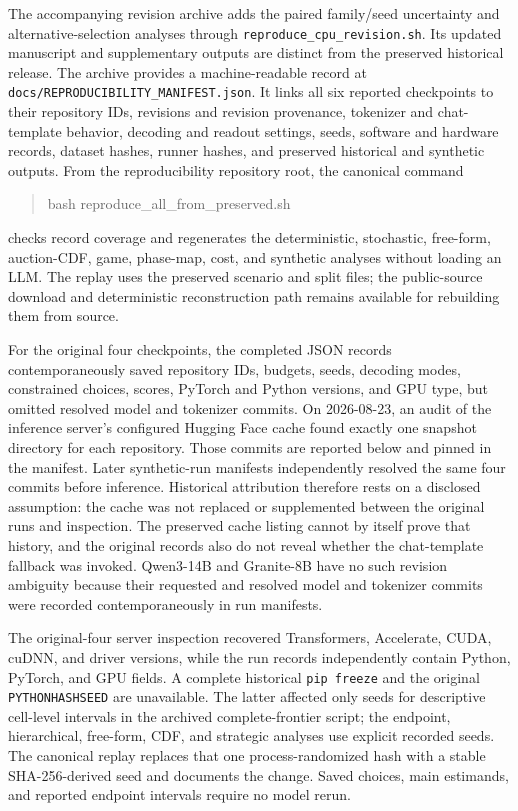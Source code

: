 \documentclass{article}
\begin{document}
The accompanying revision archive adds the paired family/seed uncertainty and alternative-selection analyses through \texttt{reproduce\_cpu\_revision.sh}. Its updated manuscript and supplementary outputs are distinct from the preserved historical release. The archive provides a machine-readable record at
\texttt{docs/REPRODUCIBILITY\_MANIFEST.json}. It links all six reported checkpoints to their repository IDs, revisions and revision provenance, tokenizer and chat-template behavior, decoding and readout settings, seeds, software and hardware records, dataset hashes, runner hashes, and preserved historical and synthetic outputs. From the reproducibility repository root, the canonical command
\begin{quote}\footnotesize\ttfamily
bash reproduce\_all\_from\_preserved.sh
\end{quote}
checks record coverage and regenerates the deterministic, stochastic, free-form, auction-CDF, game, phase-map, cost, and synthetic analyses without loading an LLM. The replay uses the preserved scenario and split files; the public-source download and deterministic reconstruction path remains available for rebuilding them from source.

For the original four checkpoints, the completed JSON records contemporaneously saved repository IDs, budgets, seeds, decoding modes, constrained choices, scores, PyTorch and Python versions, and GPU type, but omitted resolved model and tokenizer commits. On 2026-08-23, an audit of the inference server's configured Hugging Face cache found exactly one snapshot directory for each repository. Those commits are reported below and pinned in the manifest. Later synthetic-run manifests independently resolved the same four commits before inference. Historical attribution therefore rests on a disclosed assumption: the cache was not replaced or supplemented between the original runs and inspection. The preserved cache listing cannot by itself prove that history, and the original records also do not reveal whether the chat-template fallback was invoked. Qwen3-14B and Granite-8B have no such revision ambiguity because their requested and resolved model and tokenizer commits were recorded contemporaneously in run manifests.

The original-four server inspection recovered Transformers, Accelerate, CUDA, cuDNN, and driver versions, while the run records independently contain Python, PyTorch, and GPU fields. A complete historical \texttt{pip freeze} and the original \texttt{PYTHONHASHSEED} are unavailable. The latter affected only seeds for descriptive cell-level intervals in the archived complete-frontier script; the endpoint, hierarchical, free-form, CDF, and strategic analyses use explicit recorded seeds. The canonical replay replaces that one process-randomized hash with a stable SHA-256-derived seed and documents the change. Saved choices, main estimands, and reported endpoint intervals require no model rerun.
\end{document}
